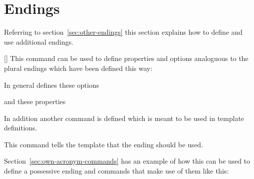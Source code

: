 \documentclass{acro-manual}
\begin{document}
\section{Endings}\label{sec:endings}
Referring to section~\vref{sec:other-endings} this section explains how to
define and use additional endings.
\begin{commands}
  []
    This command can be used to define properties and options analoguous to
    the plural endings which have been defined this way:
\end{commands}
\begin{sourcecode}
\end{sourcecode}
In general  defines these
options
\begin{options}
\end{options}
and these properties
\begin{properties}
  \Default*
  \Default*
  \Default*
  \Default*
  \Default*
  \Default*
\end{properties}
In addition another command is defined which is meant to be used in
template definitions.
\begin{commands}
    This command tells the template that the ending  should be
    used.
\end{commands}
Section~\vref{sec:own-acronym-commands} has an example of how this can be used
to define a possessive ending and commands that make use of them like this:
\begin{example}
\end{example}
\end{document}
